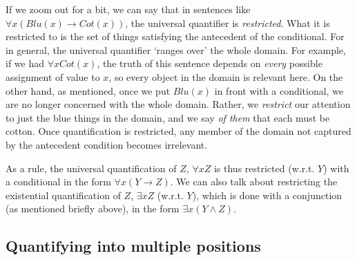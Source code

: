 If we zoom out for a bit, we can say that in sentences like $\forall x(Blu(x) \rightarrow Cot(x))$, the universal quantifier is \textit{restricted}. What it is restricted to is the set of things satisfying the antecedent of the conditional. For in general, the universal quantifier `ranges over' the whole domain. For example, if we had $\forall x Cot(x)$, the truth of this sentence depends on \textit{every} possible assignment of value to $x$, so every object in the domain is relevant here. On the other hand, as mentioned, once we put $Blu(x)$ in front with a conditional, we are no longer concerned with the whole domain. Rather, we \textit{restrict} our attention to just the blue things in the domain, and we say \textit{of them} that each must be cotton. Once quantification is restricted, any member of the domain not captured by the antecedent condition becomes irrelevant. 

As a rule, the universal quantification of $Z$, $\forall x Z$ is thus restricted (w.r.t. $Y$) with a conditional in the form $\forall x(Y \rightarrow Z)$. We can also talk about restricting the existential quantification of $Z$, $\exists x Z$ (w.r.t. $Y$), which is done with a conjunction (as mentioned briefly above), in the form $\exists x(Y \wedge Z)$.


\subsection{Quantifying into multiple positions}

